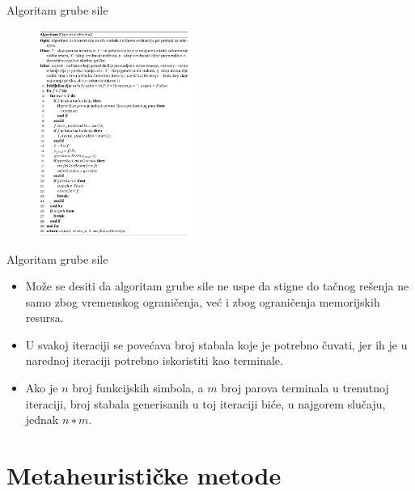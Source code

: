 \documentclass{beamer}
\begin{document}
\begin{frame}{Algoritam grube sile}
\begin{figure}[!ht]
\begin{center}
\includegraphics[width=0.45\textwidth]{images/brute_force_alg_2.png}
\end{center}
\label{fig:polyReg}
\end{figure}
\end{frame}


\begin{frame}{Algoritam grube sile}
\begin{itemize}
    \item Može se desiti da algoritam grube sile ne uspe da stigne do tačnog rešenja ne samo zbog vremenskog ograničenja, već i zbog ograničenja memorijskih resursa.
    \item U svakoj iteraciji se povećava broj stabala koje je potrebno čuvati, jer ih je u narednoj iteraciji potrebno iskoristiti kao terminale.
    \item Ako je $n$ broj funkcijskih simbola, a $m$ broj parova terminala u trenutnoj iteraciji, broj stabala generisanih u toj iteraciji biće, u najgorem slučaju, jednak $n ∗ m$.
\end{itemize}
\end{frame}


\section{Metaheurističke metode}
\end{document}
